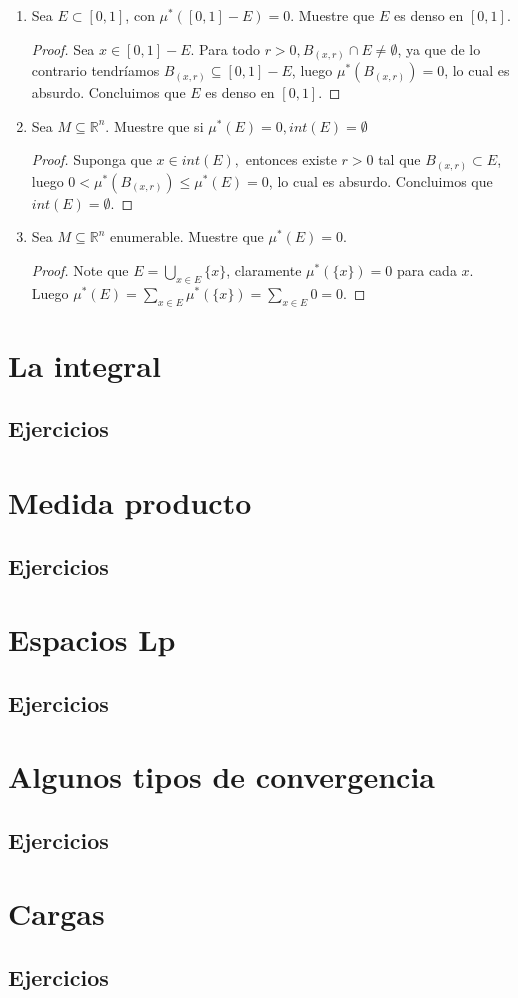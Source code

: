 \documentclass[spanish,12pt,a4paper,openany]{book}
\begin{document}
\begin{enumerate}
			\item Sea $E \subset [0,1]$, con $\mu^{*}([0,1] - E) = 0$. Muestre que $E$ es denso en $[0,1]$.
			
				\begin{proof}
					Sea $x \in [0,1] - E$. Para todo $r>0, B_{(x,r)} \cap E \neq \emptyset$, ya que de lo contrario tendríamos $B_{(x,r)} \subseteq [0,1] - E$, luego $\mu^{*} (B_{(x,r)}) = 0$, lo cual es absurdo. Concluimos que $E$ es denso en $[0,1]$. 
				\end{proof}
			
			\item Sea $M \subseteq \mathbb{R}^{n}$. Muestre que si $\mu^{*}(E) = 0, int(E) = \emptyset$
			
				\begin{proof}
					Suponga que $x \in int(E),$ entonces existe $r > 0$ tal que $B_{(x,r)} \subset E$, luego $0 < \mu^{*}(B_{(x,r)}) \leq \mu^{*} (E) = 0$, lo cual es absurdo. Concluimos que $int (E)   =  \emptyset$.
				\end{proof}
			
			\item Sea $M \subseteq \mathbb{R}^{n}$ enumerable. Muestre que $\mu^{*}(E) = 0$.
			
				\begin{proof}
					Note que $E = \bigcup_{x \in E} \{ x \}$, claramente $\mu^{*} (\{ x \}) = 0$ para cada $x$. Luego $\mu ^{*} (E) = \sum_{x \in E} \mu^{*}(\{x\}) = \sum_{x \in E} 0 = 0$.
				\end{proof}		
		\end{enumerate}
	\chapter{La integral}
	\section{Ejercicios}
	\chapter{Medida producto}
	\section{Ejercicios}
	\chapter{Espacios Lp}
	\section{Ejercicios}
	\chapter{Algunos tipos de convergencia}
	\section{Ejercicios}
	\chapter{Cargas}
	\section{Ejercicios}
	
\end{document}
